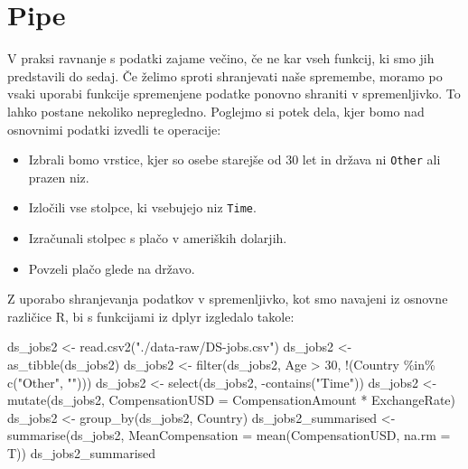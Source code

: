 \documentclass[
]{book}
\newenvironment{Shaded}{\begin{snugshade}}{\end{snugshade}}
\newcommand{\AttributeTok}[1]{\textcolor[rgb]{0.77,0.63,0.00}{#1}}
\newcommand{\DecValTok}[1]{\textcolor[rgb]{0.00,0.00,0.81}{#1}}
\newcommand{\FunctionTok}[1]{\textcolor[rgb]{0.00,0.00,0.00}{#1}}
\newcommand{\NormalTok}[1]{#1}
\newcommand{\OtherTok}[1]{\textcolor[rgb]{0.56,0.35,0.01}{#1}}
\newcommand{\SpecialCharTok}[1]{\textcolor[rgb]{0.00,0.00,0.00}{#1}}
\newcommand{\StringTok}[1]{\textcolor[rgb]{0.31,0.60,0.02}{#1}}
\providecommand{\tightlist}{%
  \setlength{\itemsep}{0pt}\setlength{\parskip}{0pt}}
\begin{document}
\hypertarget{pipe}{%
\section{Pipe}\label{pipe}}

V praksi ravnanje s podatki zajame večino, če ne kar vseh funkcij, ki smo jih predstavili do sedaj. Če želimo sproti shranjevati naše spremembe, moramo po vsaki uporabi funkcije spremenjene podatke ponovno shraniti v spremenljivko. To lahko postane nekoliko nepregledno. Poglejmo si potek dela, kjer bomo nad osnovnimi podatki izvedli te operacije:

\begin{itemize}
\tightlist
\item
  Izbrali bomo vrstice, kjer so osebe starejše od 30 let in država ni \texttt{Other} ali prazen niz.
\item
  Izločili vse stolpce, ki vsebujejo niz \texttt{Time}.
\item
  Izračunali stolpec s plačo v ameriških dolarjih.
\item
  Povzeli plačo glede na državo.
\end{itemize}

Z uporabo shranjevanja podatkov v spremenljivko, kot smo navajeni iz osnovne različice R, bi s funkcijami iz dplyr izgledalo takole:

\begin{Shaded}
\begin{Highlighting}[]
\NormalTok{ds\_jobs2 }\OtherTok{\textless{}{-}} \FunctionTok{read.csv2}\NormalTok{(}\StringTok{"./data{-}raw/DS{-}jobs.csv"}\NormalTok{)}
\NormalTok{ds\_jobs2 }\OtherTok{\textless{}{-}} \FunctionTok{as\_tibble}\NormalTok{(ds\_jobs2)}
\NormalTok{ds\_jobs2 }\OtherTok{\textless{}{-}} \FunctionTok{filter}\NormalTok{(ds\_jobs2, Age }\SpecialCharTok{\textgreater{}} \DecValTok{30}\NormalTok{, }\SpecialCharTok{!}\NormalTok{(Country }\SpecialCharTok{\%in\%} \FunctionTok{c}\NormalTok{(}\StringTok{"Other"}\NormalTok{, }\StringTok{""}\NormalTok{)))}
\NormalTok{ds\_jobs2 }\OtherTok{\textless{}{-}} \FunctionTok{select}\NormalTok{(ds\_jobs2, }\SpecialCharTok{{-}}\FunctionTok{contains}\NormalTok{(}\StringTok{"Time"}\NormalTok{))}
\NormalTok{ds\_jobs2 }\OtherTok{\textless{}{-}} \FunctionTok{mutate}\NormalTok{(ds\_jobs2, }\AttributeTok{CompensationUSD =}\NormalTok{ CompensationAmount }\SpecialCharTok{*}\NormalTok{ ExchangeRate)}
\NormalTok{ds\_jobs2 }\OtherTok{\textless{}{-}} \FunctionTok{group\_by}\NormalTok{(ds\_jobs2, Country)}
\NormalTok{ds\_jobs2\_summarised }\OtherTok{\textless{}{-}} \FunctionTok{summarise}\NormalTok{(ds\_jobs2, }\AttributeTok{MeanCompensation =} \FunctionTok{mean}\NormalTok{(CompensationUSD, }\AttributeTok{na.rm =}\NormalTok{ T))}
\NormalTok{ds\_jobs2\_summarised}
\end{Highlighting}
\end{Shaded}
\end{document}

